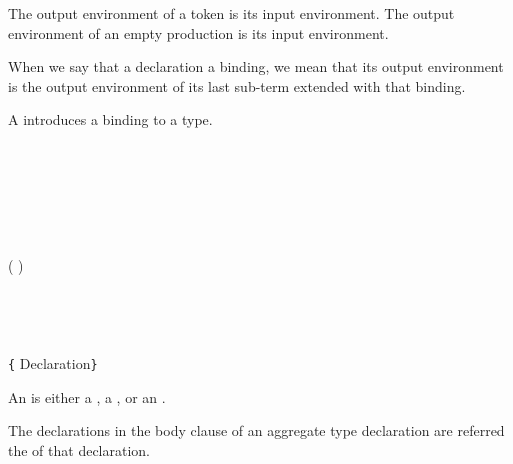 The output environment of a token is its input environment.
The output environment of an empty production is its input environment.

When we say that a declaration  a binding, we mean that its output environment is the output environment of its last sub-term extended with that binding.






A  introduces a binding to a type.

\begin{Syntax}
     \\
         \\
        \SynOr {} \\
        \SynOr {} \\
\end{Syntax}


\begin{Syntax}
     \\
        ( \SynOr {} \SynOr {})  \\
        \SynOpt \\
        \SynOpt
        \SynOpt \\
         \code{;}\SynOpt\\

     \\
        \lstinline|{| Declaration\SynStar \lstinline|}| 
\end{Syntax}

An  is either a , a , or an .

The declarations in the body clause of an aggregate type declaration are referred the  of that declaration.

